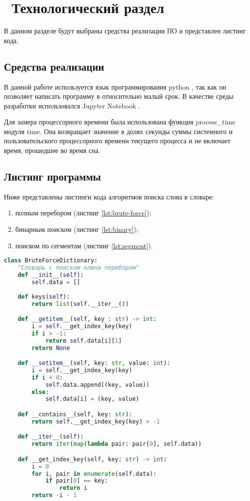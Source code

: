 \chapter{ Технологический раздел}
\label{cha:technological}

    В данном разделе будут выбраны средства реализации ПО и представлен листинг кода. 

    \section{Средства реализации}
        В данной работе используется язык программирования python \cite{python}, так как
        он позволяет написать программу в относительно малый срок.
        В качестве среды разработки использовался Jupyter Notebook \cite{jupyter-notebook}.

        Для замера процессорного времени была использована функция process\_time модуля time. \cite{process_time}
        Она возвращает значение в долях секунды суммы системного и пользовательского процессорного времени текущего процесса и 
        не включает время, прошедшее во время сна.

    \section{Листинг программы}
        Ниже представлены листинги кода алгоритмов поиска слова в словаре:
        \begin{enumerate}
            \item полным перебором (листинг \ref{lst:brute-force});
            \item бинарным поиском (листинг \ref{lst:binary});
            \item поиском по сегментам (листинг \ref{lst:segment}).
        \end{enumerate}
        
        \begin{lstlisting}[language=python, label=lst:brute-force, caption=Реализация алгоритма поиска слов в словаре полным перебором]
class BruteForceDictionary:
    "Словарь с поиском ключа перебором"
    def __init__(self):
        self.data = []
    
    def keys(self):
        return list(self.__iter__())

    def __getitem__(self, key : str) -> int:
        i = self.__get_index_key(key)
        if i > -1:
            return self.data[i][1]
        return None

    def __setitem__(self, key: str, value: int):
        i = self.__get_index_key(key)
        if i < 0:
            self.data.append((key, value))
        else:
            self.data[i] = (key, value)

    def __contains__(self, key: str):
        return self.__get_index_key(key) > -1

    def __iter__(self):
        return iter(map(lambda pair: pair[0], self.data))

    def __get_index_key(self, key: str) -> int:
        i = 0
        for i, pair in enumerate(self.data):
            if pair[0] == key:
                return i
        return -i - 1
        \end{lstlisting}

